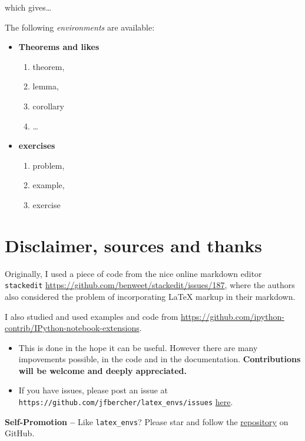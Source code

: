     which gives\ldots{}

The following \textit{environments} are available:
\begin{itemize} \item \textbf{Theorems and likes}
\begin{enumerate} \item theorem, \item lemma, \item corollary \item
\ldots{} \end{enumerate} \item \textbf{exercises}
\begin{enumerate} \item problem, \item example, \item exercise
\end{enumerate} \end{itemize}

    \section{Disclaimer, sources and
thanks}\label{disclaimer-sources-and-thanks}

    Originally, I used a piece of code from the nice online markdown editor
\texttt{stackedit}
\url{https://github.com/benweet/stackedit/issues/187}, where the authors
also considered the problem of incorporating LaTeX markup in their
markdown.

I also studied and used examples and code from
\url{https://github.com/ipython-contrib/IPython-notebook-extensions}.

\begin{itemize}
\item
  This is done in the hope it can be useful. However there are many
  impovements possible, in the code and in the documentation.
  \textbf{Contributions will be welcome and deeply appreciated.}
\item
  If you have issues, please post an issue at
  \texttt{https://github.com/jfbercher/latex\_envs/issues}
  \href{https://github.com/jfbercher/latex_envs/issues}{here}.
\end{itemize}

\textbf{Self-Promotion --} Like \texttt{latex\_envs}? Please star and
follow the
\href{https://github.com/jfbercher/jupyter_latex_envs}{repository} on
GitHub.

    